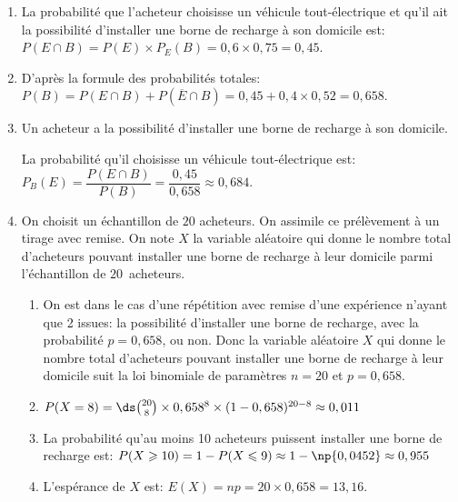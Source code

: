 \begin{enumerate}
\item La probabilité que l'acheteur choisisse un véhicule tout-électrique et qu'il ait la possibilité d'installer une borne de recharge à son domicile est:\\
$P(E\cap B) = P(E)\times P_E(B)=0,6\times 0,75 = 0,45$.


\item %
D'après la formule des probabilités totales:\\
$P(B)= P(E\cap B) + P \left (\overline{E}\cap B \right ) = 0,45+0,4\times 0,52=0,658$.

\item Un acheteur a la possibilité d'installer une borne de recharge à son domicile.

La probabilité qu'il choisisse un véhicule tout-électrique est:\\
$P_B(E)=\dfrac{P(E\cap B)}{P(B)} = \dfrac{0,45}{0,658}\approx 0,684$.

\item On choisit un échantillon de $20$ acheteurs. On assimile ce prélèvement à un tirage avec remise.
On note $X$ la variable aléatoire qui donne le nombre total d'acheteurs pouvant installer une borne de recharge à leur domicile parmi l'échantillon de $20$~acheteurs.

	\begin{enumerate}
	\item %
On est dans le cas d'une répétition avec remise d'une expérience n'ayant que 2 issues: la possibilité d'installer une borne de recharge, avec la probabilité $p=0,658$, ou non.
Donc la variable aléatoire $X$ qui donne le nombre total d'acheteurs pouvant installer une borne de recharge à leur domicile suit la loi binomiale de paramètres $n=20$ et $p=0,658$.

		\item $P(X = 8) = \ds\binom{20}{8}\times 0,658^8\times (1-0,658)^{20-8} \approx 0,011$

		\item La probabilité qu'au moins 10 acheteurs puissent installer une borne de recharge est:
$P(X\geqslant 10) = 1-P(X\leqslant 9) \approx 1- \np{0,0452} \approx 0,955$

		\item L'espérance de $X$ est: $E(X)=np=20\times 0,658 = 13,16$.


\end{enumerate}
\end{enumerate}
